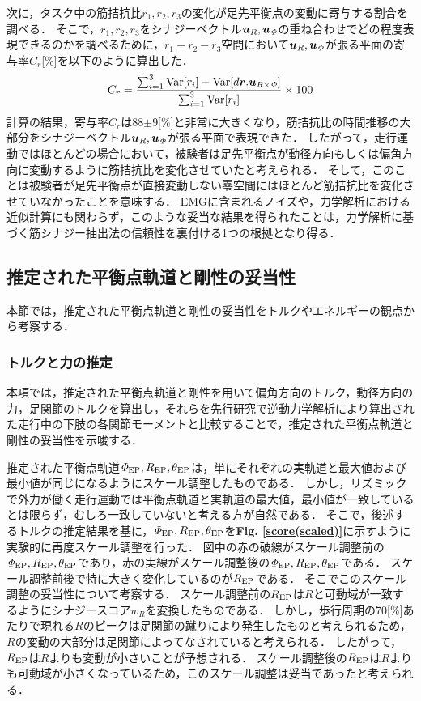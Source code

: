 次に，タスク中の筋拮抗比$r_1,r_2,r_3$の変化が足先平衡点の変動に寄与する割合を調べる．
そこで，$r_1,r_2,r_3$をシナジーベクトル$\mbox{\boldmath $u$}_R,\mbox{\boldmath $u$}_{\it \Phi}$の重ね合わせでどの程度表現できるのかを調べるために，$r_1-r_2-r_3$空間において$\mbox{\boldmath $u$}_R,\mbox{\boldmath $u$}_{\it \Phi}$が張る平面の寄与率$C_r$[\%]を以下のように算出した．
\begin{eqnarray}
 \label{def_CR}
 C_r=\frac{\sum_{i=1}^3{\rm Var}[r_i]-{\rm Var}[d\mbox{\boldmath $r$}.\mbox{\boldmath $u$}_{R\times{\it \Phi}}]}{\sum_{i=1}^3{\rm Var}[r_i]}\times100
\end{eqnarray}
計算の結果，寄与率$C_r$は88$\pm$9[\%]と非常に大きくなり，筋拮抗比の時間推移の大部分をシナジーベクトル$\mbox{\boldmath $u$}_R,\mbox{\boldmath $u$}_{\it \Phi}$が張る平面で表現できた．
したがって，走行運動ではほとんどの場合において，被験者は足先平衡点が動径方向もしくは偏角方向に変動するように筋拮抗比を変化させていたと考えられる．
そして，このことは被験者が足先平衡点が直接変動しない零空間にはほとんど筋拮抗比を変化させていなかったことを意味する．
EMGに含まれるノイズや，力学解析における近似計算にも関わらず，このような妥当な結果を得られたことは，力学解析に基づく筋シナジー抽出法の信頼性を裏付ける1つの根拠となり得る．

\subsection{推定された平衡点軌道と剛性の妥当性}
本節では，推定された平衡点軌道と剛性の妥当性をトルクやエネルギーの観点から考察する．

\subsubsection{トルクと力の推定}
本項では，推定された平衡点軌道と剛性を用いて偏角方向のトルク，動径方向の力，足関節のトルクを算出し，それらを先行研究で逆動力学解析により算出された走行中の下肢の各関節モーメントと比較することで，推定された平衡点軌道と剛性の妥当性を示唆する．

推定された平衡点軌道${\it \Phi}_{\rm EP},R_{\rm EP},\theta_{\rm EP}$は，単にそれぞれの実軌道と最大値および最小値が同じになるようにスケール調整したものである．
しかし，リズミックで外力が働く走行運動では平衡点軌道と実軌道の最大値，最小値が一致しているとは限らず，むしろ一致していないと考える方が自然である．
そこで，後述するトルクの推定結果を基に，${\it \Phi}_{\rm EP},R_{\rm EP},\theta_{\rm EP}$を{\bf Fig. \ref{score(scaled)}}に示すように実験的に再度スケール調整を行った．
図中の赤の破線がスケール調整前の${\it \Phi}_{\rm EP},R_{\rm EP},\theta_{\rm EP}$であり，赤の実線がスケール調整後の${\it \Phi}_{\rm EP},R_{\rm EP},\theta_{\rm EP}$である．
スケール調整前後で特に大きく変化しているのが$R_{\rm EP}$である．
そこでこのスケール調整の妥当性について考察する．
スケール調整前の$R_{\rm EP}$は$R$と可動域が一致するようにシナジースコア$w_R$を変換したものである．
しかし，歩行周期の70[\%]あたりで現れる$R$のピークは足関節の蹴りにより発生したものと考えられるため，$R$の変動の大部分は足関節によってなされていると考えられる．
したがって，$R_{\rm EP}$は$R$よりも変動が小さいことが予想される．
スケール調整後の$R_{\rm EP}$は$R$よりも可動域が小さくなっているため，このスケール調整は妥当であったと考えられる．

